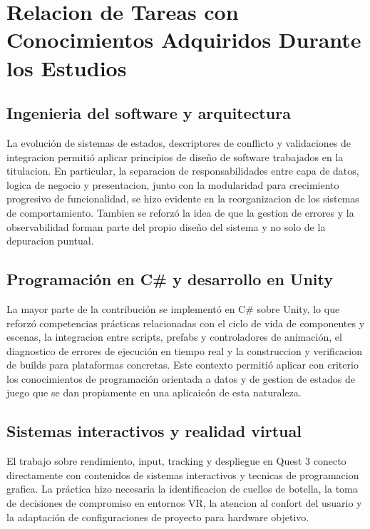 \section{Relacion de Tareas con Conocimientos Adquiridos Durante los Estudios}

\subsection{Ingenieria del software y arquitectura}
La evolución de sistemas de estados, descriptores de conflicto y validaciones de integracion permitió aplicar principios de diseño de software trabajados en la titulacion. En particular, la separacion de responsabilidades entre capa de datos, logica de negocio y presentacion, junto con la modularidad para crecimiento progresivo de funcionalidad, se hizo evidente en la reorganizacion de los sistemas de comportamiento. Tambien se reforzó la idea de que la gestion de errores y la observabilidad forman parte del propio diseño del sistema y no solo de la depuracion puntual.\par

\subsection{Programación en C\# y desarrollo en Unity}
La mayor parte de la contribución se implementó en C\# sobre Unity, lo que reforzó competencias prácticas relacionadas con el ciclo de vida de componentes y escenas, la integracion entre scripts, prefabs y controladores de animación, el diagnostico de errores de ejecución en tiempo real y la construccion y verificacion de builds para plataformas concretas. Este contexto permitió aplicar con criterio los conocimientos de programación orientada a datos y de gestion de estados de juego que se dan propiamente en una aplicaicón de esta naturaleza.\par

\subsection{Sistemas interactivos y realidad virtual}
El trabajo sobre rendimiento, input, tracking y despliegue en Quest 3 conecto directamente con contenidos de sistemas interactivos y tecnicas de programacion grafica. La práctica hizo necesaria la identificacion de cuellos de botella, la toma de decisiones de compromiso en entornos VR, la atencion al confort del usuario y la adaptación de configuraciones de proyecto para hardware objetivo.\par

